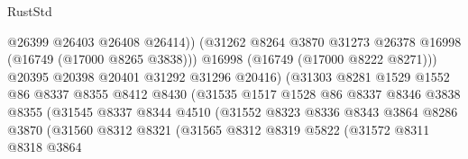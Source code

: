\begin{lexlean}{RustStd}
\begin{coremodule}
                                        @26399
                                        @26403
                                        @26408
                                        @26414))
                                    (@31262
                                      @8264
                                      @3870
                                      @31273
                                      @26378
                                      @16998
                                      (@16749 (@17000 @8265 @3838)))
                                    @16998
                                    (@16749 (@17000 @8222 @8271)))
                                  @20395
                                  @20398
                                  @20401
                                  @31292
                                  @31296
                                  @20416)
                                (@31303
                                  @8281
                                  @1529
                                  @1552
                                  @86
                                  @8337
                                  @8355
                                  @8412
                                  @8430
                                  (@31535
                                    @1517
                                    @1528
                                    @86
                                    @8337
                                    @8346
                                    @3838
                                    @8355
                                    (@31545
                                      @8337
                                      @8344
                                      @4510
                                      (@31552
                                        @8323
                                        @8336
                                        @8343
                                        @3864
                                        @8286
                                        @3870
                                        (@31560
                                          @8312
                                          @8321
                                          (@31565
                                            @8312
                                            @8319
                                            @5822
                                            (@31572
                                              @8311
                                              @8318
                                              @3864

\end{coremodule}
\end{lexlean}
